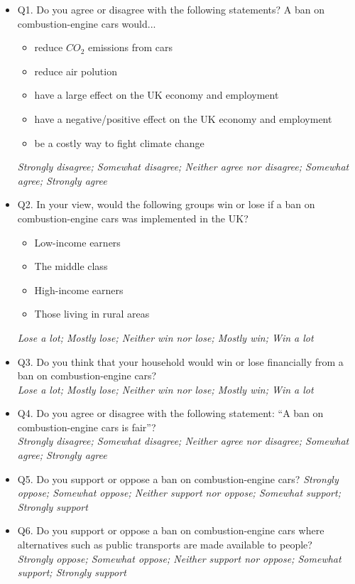 \documentclass{article}
\begin{document}
\begin{itemize}
    \item Q1. Do you agree or disagree with the following statements? A ban on combustion-engine cars would...
    \begin{itemize}
        \item reduce $CO_2$ emissions from cars
        \item reduce air polution
        \item have a large effect on the UK economy and employment
        \item have a negative/positive effect on the UK economy and employment
        \item be a costly way to fight climate change
    \end{itemize}
    \textit{Strongly disagree; Somewhat disagree; Neither agree nor disagree; Somewhat agree; Strongly agree}
    \item Q2. In your view, would the following groups win or lose if a ban on combustion-engine cars was implemented in the UK?
    \begin{itemize}
    \item Low-income earners
    \item The middle class
    \item High-income earners
    \item Those living in rural areas
    \end{itemize}
    \textit{Lose a lot; Mostly lose; Neither win nor lose; Mostly win; Win a lot}
    \item Q3. Do you think that your household would win or lose financially from a ban on combustion-engine cars?  \\
    \textit{Lose a lot; Mostly lose; Neither win nor lose; Mostly win; Win a lot}
    \item Q4. Do you agree or disagree with the following statement: ``A ban on combustion-engine cars is fair''? \\
    \textit{Strongly disagree; Somewhat disagree; Neither agree nor disagree; Somewhat agree; Strongly agree}
    \item Q5. Do you support or oppose a ban on combustion-engine cars?
    \textit{Strongly oppose; Somewhat oppose; Neither support nor oppose; Somewhat support; Strongly support}
    \item Q6. Do you support or oppose a ban on combustion-engine cars where alternatives such as public transports are made available to people? \\
    \textit{Strongly oppose; Somewhat oppose; Neither support nor oppose; Somewhat support; Strongly support}
\end{itemize}
\end{document}
